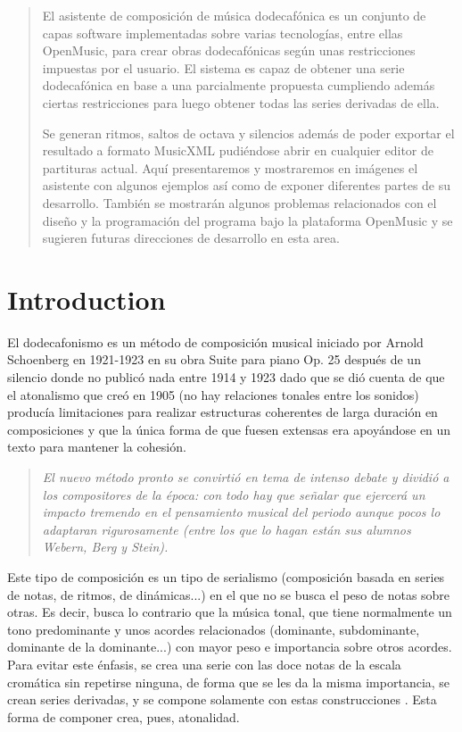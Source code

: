 \documentclass[12pt]{article}
\begin{document}
\maketitle

\begin{abstract}
El asistente de composición de música dodecafónica es un conjunto de capas software implementadas sobre varias tecnologías, entre ellas OpenMusic, para crear obras dodecafónicas según unas restricciones impuestas por el usuario. El sistema es capaz de obtener una serie dodecafónica en base a una parcialmente propuesta cumpliendo además ciertas restricciones para luego obtener todas las series derivadas de ella.

Se generan ritmos, saltos de octava y silencios además de poder exportar el resultado a formato MusicXML pudiéndose abrir en cualquier editor de partituras actual. Aquí presentaremos y mostraremos en imágenes el asistente con algunos ejemplos así como de exponer diferentes partes de su desarrollo. También se mostrarán algunos problemas relacionados con el diseño y la programación del programa bajo la plataforma OpenMusic y se sugieren futuras direcciones de desarrollo en esta area.
\end{abstract}

\section{Introduction}
El dodecafonismo es un método de composición musical iniciado por Arnold Schoenberg en 1921-1923 en su obra Suite para piano Op. 25 \cite{styleandidea} después de un silencio donde no publicó nada entre 1914 y 1923 dado que se dió cuenta de que el atonalismo que creó en 1905 (no hay relaciones tonales entre los sonidos) producía limitaciones para realizar estructuras coherentes de larga duración en composiciones y que la única forma de que fuesen extensas era apoyándose en un texto para mantener la cohesión.

\begin{quote}
\em El nuevo método pronto se convirtió en tema de intenso debate y dividió a los compositores de la época: con todo hay que señalar que ejercerá un impacto tremendo en el pensamiento musical del periodo aunque pocos lo adaptaran rigurosamente (entre los que lo hagan están sus alumnos Webern, Berg y Stein).\cite{historiadelamusica}
\end{quote}

Este tipo de composición es un tipo de serialismo (composición basada en series de notas, de ritmos, de dinámicas...) en el que no se busca el peso de notas sobre otras. Es decir, busca lo contrario que la música tonal, que tiene normalmente un tono predominante y unos acordes relacionados (dominante, subdominante, dominante de la dominante...) con mayor peso e importancia sobre otros acordes. Para evitar este énfasis, se crea una serie con las doce notas de la escala cromática  sin repetirse ninguna, de forma que se les da la misma importancia, se crean series derivadas, y se compone solamente con estas construcciones \cite{wiki:twelvetonetechnique}. Esta forma de componer crea, pues, atonalidad.
\end{document}
